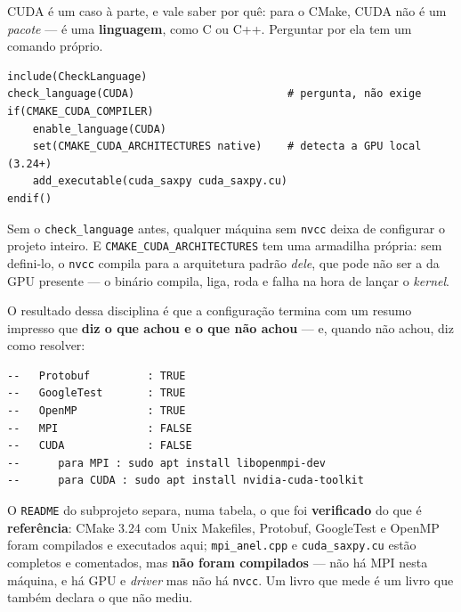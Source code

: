 CUDA é um caso à parte, e vale saber por quê: para o CMake, CUDA não é um
\emph{pacote} --- é uma \textbf{linguagem}, como C ou C++. Perguntar por ela
tem um comando próprio.

\begin{lstlisting}[style=bt, language=Meson,
    morekeywords={include,check_language,enable_language,set,if,endif},
    caption={\texttt{check\_language} pergunta sem abortar. Resumo de
             \texttt{src/cmake/CMakeLists.txt}, seção 3.}]
include(CheckLanguage)
check_language(CUDA)                        # pergunta, não exige
if(CMAKE_CUDA_COMPILER)
    enable_language(CUDA)
    set(CMAKE_CUDA_ARCHITECTURES native)    # detecta a GPU local (3.24+)
    add_executable(cuda_saxpy cuda_saxpy.cu)
endif()
\end{lstlisting}

\begin{armadilha}
Sem o \texttt{check\_language} antes, qualquer máquina sem \texttt{nvcc} deixa
de configurar o projeto inteiro. E \texttt{CMAKE\_CUDA\_ARCHITECTURES} tem uma
armadilha própria: sem defini-lo, o \texttt{nvcc} compila para a arquitetura
padrão \emph{dele}, que pode não ser a da GPU presente --- o binário compila,
liga, roda e falha na hora de lançar o \emph{kernel}.
\end{armadilha}

O resultado dessa disciplina é que a configuração termina com um resumo
impresso que \textbf{diz o que achou e o que não achou} --- e, quando não achou,
diz como resolver:

\begin{lstlisting}[style=bt, language=bash,
    caption={Saída real de \texttt{cmake -S . -B build} nesta máquina, copiada do
             \texttt{README} de \texttt{src/cmake/}.}]
--   Protobuf         : TRUE
--   GoogleTest       : TRUE
--   OpenMP           : TRUE
--   MPI              : FALSE
--   CUDA             : FALSE
--      para MPI : sudo apt install libopenmpi-dev
--      para CUDA : sudo apt install nvidia-cuda-toolkit
\end{lstlisting}

\begin{aviso}
O \texttt{README} do subprojeto separa, numa tabela, o que foi
\textbf{verificado} do que é \textbf{referência}: CMake 3.24 com Unix
Makefiles, Protobuf, GoogleTest e OpenMP foram compilados e executados aqui;
\texttt{mpi\_anel.cpp} e \texttt{cuda\_saxpy.cu} estão completos e comentados,
mas \textbf{não foram compilados} --- não há MPI nesta máquina, e há GPU e
\emph{driver} mas não há \texttt{nvcc}. Um livro que mede é um livro que também
declara o que não mediu.
\end{aviso}

